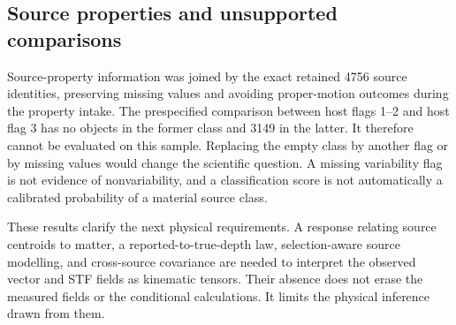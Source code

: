 \subsection{Source properties and unsupported comparisons}

Source-property information was joined by the exact retained 4756 source identities, preserving missing values and avoiding proper-motion outcomes during the property intake. The prespecified comparison between host flags 1--2 and host flag 3 has no objects in the former class and 3149 in the latter. It therefore cannot be evaluated on this sample. Replacing the empty class by another flag or by missing values would change the scientific question. A missing variability flag is not evidence of nonvariability, and a classification score is not automatically a calibrated probability of a material source class.

These results clarify the next physical requirements. A response relating source centroids to matter, a reported-to-true-depth law, selection-aware source modelling, and cross-source covariance are needed to interpret the observed vector and STF fields as kinematic tensors. Their absence does not erase the measured fields or the conditional calculations. It limits the physical inference drawn from them.
